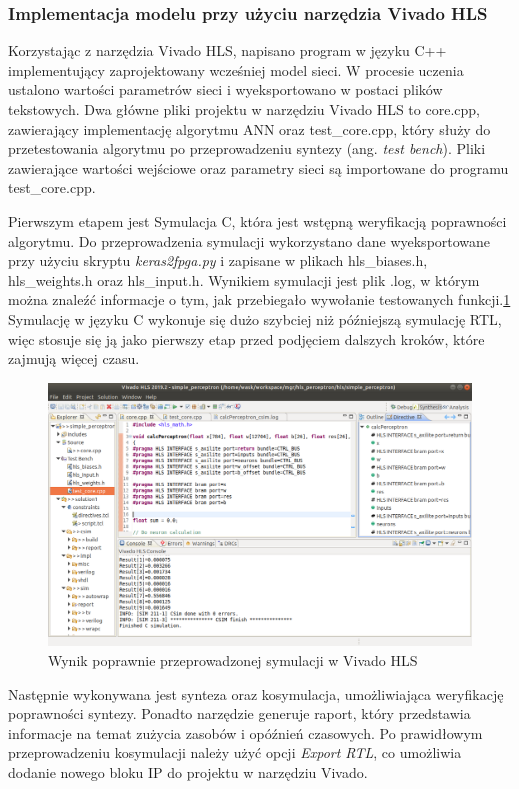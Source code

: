 \subsubsection{Implementacja modelu przy użyciu narzędzia Vivado HLS}

Korzystając z narzędzia Vivado HLS, napisano program w języku C++ implementujący 
zaprojektowany wcześniej model sieci. W procesie uczenia ustalono wartości parametrów 
sieci i wyeksportowano w postaci plików tekstowych. Dwa główne pliki projektu w narzędziu Vivado HLS to core.cpp, zawierający 
implementację algorytmu ANN oraz test\_core.cpp, który służy do przetestowania
algorytmu po przeprowadzeniu syntezy (ang. \emph{test bench}).   
Pliki zawierające wartości wejściowe oraz parametry sieci są importowane 
do programu test\_core.cpp. 

Pierwszym etapem jest Symulacja C, która jest wstępną weryfikacją poprawności
algorytmu. Do przeprowadzenia symulacji wykorzystano dane wyeksportowane przy użyciu 
skryptu \emph{keras2fpga.py} i zapisane w plikach hls\_biases.h, hls\_weights.h oraz 
hls\_input.h. Wynikiem symulacji jest plik .log, w którym można znaleźć informacje o
tym, jak przebiegało wywołanie testowanych funkcji.\ref{hls_design_sim}
Symulację w języku C wykonuje się dużo szybciej niż późniejszą symulację RTL, więc
stosuje się ją jako pierwszy etap przed podjęciem dalszych kroków, które zajmują 
więcej czasu.

\begin{figure}[!h]
  \centering
  \includegraphics[width=\textwidth]{img/vivado_hls_sim.png}
  \caption{Wynik poprawnie przeprowadzonej symulacji w Vivado HLS}
  \label{hls_design_sim}
\end{figure}


Następnie wykonywana jest synteza oraz kosymulacja, umożliwiająca 
weryfikację poprawności syntezy. Ponadto narzędzie generuje raport, który przedstawia
informacje na temat zużycia zasobów i opóźnień czasowych. Po prawidłowym 
przeprowadzeniu kosymulacji należy użyć opcji \emph{Export RTL}, co umożliwia 
dodanie nowego bloku IP do projektu w narzędziu Vivado.


